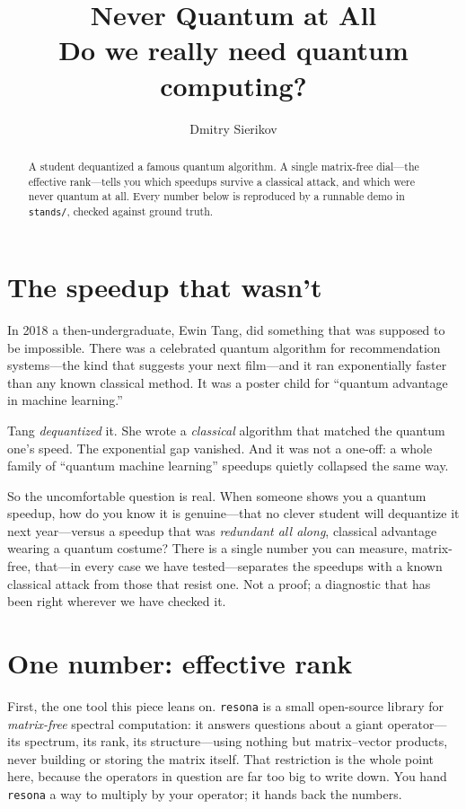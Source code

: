 \documentclass[11pt]{article}
\title{\textbf{Never Quantum at All}\\[6pt]
 \large Do we really need quantum computing?}
\author{Dmitry Sierikov}
\date{}
\begin{document}
\maketitle

\begin{abstract}
\noindent A student dequantized a famous quantum algorithm. A single matrix-free
dial---the effective rank---tells you which speedups survive a classical attack,
and which were never quantum at all. Every number below is reproduced by a
runnable demo in \texttt{stands/}, checked against ground truth.
\end{abstract}

\section*{The speedup that wasn't}

In 2018 a then-undergraduate, Ewin Tang, did something that was supposed to be
impossible. There was a celebrated quantum algorithm for recommendation
systems---the kind that suggests your next film---and it ran exponentially faster
than any known classical method. It was a poster child for ``quantum advantage in
machine learning.''

Tang \emph{dequantized} it. She wrote a \emph{classical} algorithm that matched the
quantum one's speed. The exponential gap vanished. And it was not a one-off: a
whole family of ``quantum machine learning'' speedups quietly collapsed the same
way.

So the uncomfortable question is real. When someone shows you a quantum speedup,
how do you know it is genuine---that no clever student will dequantize it next
year---versus a speedup that was \emph{redundant all along}, classical advantage
wearing a quantum costume? There is a single number you can measure, matrix-free,
that---in every case we have tested---separates the speedups with a known classical
attack from those that resist one. Not a proof; a diagnostic that has been right
wherever we have checked it.

\section*{One number: effective rank}

First, the one tool this piece leans on. \texttt{resona} is a small open-source
library for \emph{matrix-free} spectral computation: it answers questions about a
giant operator---its spectrum, its rank, its structure---using nothing but
matrix--vector products, never building or storing the matrix itself. That
restriction is the whole point here, because the operators in question are far too
big to write down. You hand \texttt{resona} a way to multiply by your operator; it
hands back the numbers.
\end{document}
